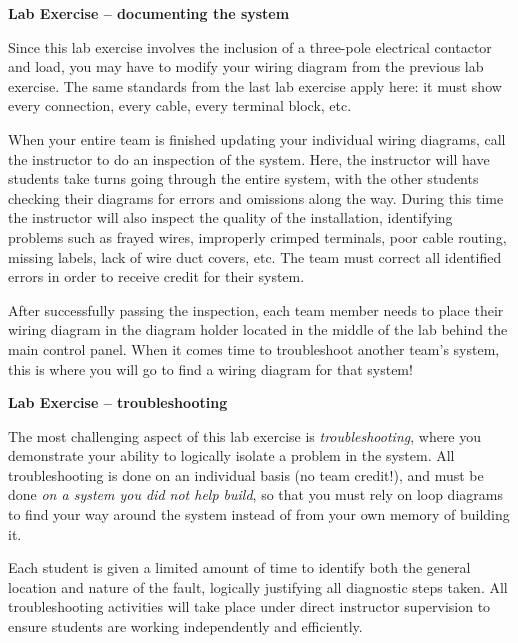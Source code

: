 \documentclass[12pt,a4paper]{article}
\begin{document}
\begin{itemize}
\vfil



\vfil \eject

\noindent
{\bf Lab Exercise -- documenting the system}

\vskip 5pt

Since this lab exercise involves the inclusion of a three-pole electrical contactor and load, you may have to modify your wiring diagram from the previous lab exercise.  The same standards from the last lab exercise apply here: it must show every connection, every cable, every terminal block, etc.  

When your entire team is finished updating your individual wiring diagrams, call the instructor to do an inspection of the system.  Here, the instructor will have students take turns going through the entire system, with the other students checking their diagrams for errors and omissions along the way.  During this time the instructor will also inspect the quality of the installation, identifying problems such as frayed wires, improperly crimped terminals, poor cable routing, missing labels, lack of wire duct covers, etc.  The team must correct all identified errors in order to receive credit for their system.  

After successfully passing the inspection, each team member needs to place their wiring diagram in the diagram holder located in the middle of the lab behind the main control panel.  When it comes time to troubleshoot another team's system, this is where you will go to find a wiring diagram for that system!

\vskip 10pt







\vfil \eject

\noindent
{\bf Lab Exercise -- troubleshooting}

\vskip 5pt

The most challenging aspect of this lab exercise is {\it troubleshooting}, where you demonstrate your ability to logically isolate a problem in the system.  All troubleshooting is done on an individual basis (no team credit!), and must be done {\it on a system you did not help build}, so that you must rely on loop diagrams to find your way around the system instead of from your own memory of building it.

Each student is given a limited amount of time to identify both the general location and nature of the fault, logically justifying all diagnostic steps taken.  All troubleshooting activities will take place under direct instructor supervision to ensure students are working independently and efficiently. 


\end{itemize}
\end{document}
